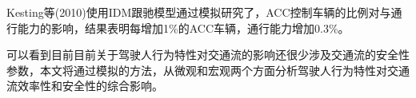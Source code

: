 % 
% 
 




Kesting等(2010)使用IDM跟驰模型通过模拟研究了，ACC控制车辆的比例对与通行能力的影响，结果表明每增加1\%的ACC车辆，通行能力增加0.3\%\cite{Kesting2010}。


可以看到目前目前关于驾驶人行为特性对交通流的影响还很少涉及交通流的安全性参数，本文将通过模拟的方法，从微观和宏观两个方面分析驾驶人行为特性对交通流效率性和安全性的综合影响。
